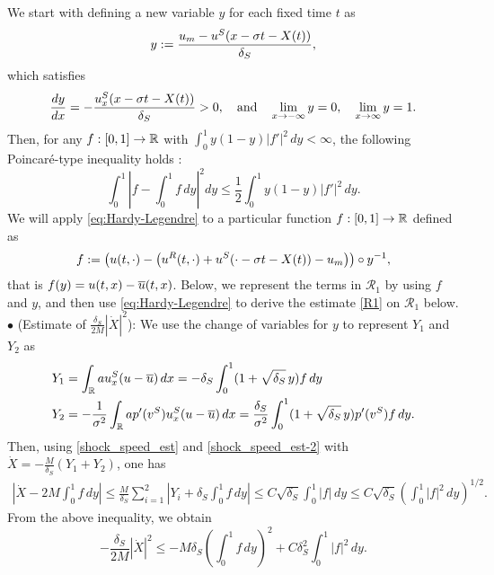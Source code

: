 \documentclass[11pt,reqno]{amsart}
\begin{document}
	We start with defining a new variable $y$ for each fixed time $t$ as
	\begin{equation*} 
	y:=\frac{u_m -u^S(x-\sigma t-X(t))}{\delta_S},
	\end{equation*}
	which satisfies
	\begin{equation*}
	\frac{d y}{d x} = -\frac{u^S_x (x-\sigma t-X(t))}{\delta_S} >0,\quad\mbox{and}\quad\lim_{x\to -\infty} y=0, \quad \lim_{x \to \infty}y=1.
	\end{equation*}
	Then, for any $f:[0,1] \to \mathbb{R}$ with $\int_0^1 y(1-y) |f'|^2 \, dy <\infty$, the following Poincar\'e-type inequality holds \cite[Lemma 2.9]{KV21}:
	\begin{equation}\label{eq:Hardy-Legendre}
		\int_0^1 \left| f-\int_0^1 f \,dy \right|^2 dy \le \frac{1}{2} \int_0^1 y(1-y)|f'|^2 \,dy.
	\end{equation}
	We will apply \eqref{eq:Hardy-Legendre} to a particular function $f:[0,1]\to\mathbb{R}$ defined as
	\begin{equation*} 
	f:=\left(u(t,\cdot)-\left( u^R(t,\cdot)+u^S(\cdot-\sigma t-X(t) )-u_m \right)   \right)\circ y^{-1},
	\end{equation*}
	that is $f(y)=u(t,x)-\overline{u}(t,x)$. Below, we represent the terms in $\mathcal{R}_1$ by using $f$ and $y$, and then use \eqref{eq:Hardy-Legendre} to derive the estimate \eqref{R1} on $\mathcal{R}_1$ below.\\
	
	\noindent $\bullet$  (Estimate of $\frac{\delta_S}{2M}|\dot{X}|^2$): 
	We use the change of variables for $y$ to represent $Y_1$ and $Y_2$ as 
 \begin{align*}
     &Y_1=\int_{\mathbb{R}} a u^S_x (u-\overline{u})\,dx
	=-\delta_S \int_0^1 (1+\sqrt{\delta_S}\, y) f \,dy \\
     &Y_2=-\frac{1}{\sigma^2} \int_{\mathbb{R}} a p'(v^S)u^S_x (u-\overline{u}) \, d x=\frac{\delta_S}{\sigma^2} \int_0^1(1+\sqrt{\delta_S}\, y) p'(v^S) f \, dy.
 \end{align*}
	Then, using \eqref{shock_speed_est} and \eqref{shock_speed_est-2} with $\dot{X}=-\frac{M}{\delta_S}(Y_1+Y_2)$, one has
    \begin{align*}
    \left| \dot{X} - 2 M \int_0^1 f \, dy \right| \le \frac{M}{\delta_S} \sum_{i=1}^2 \left| Y_i +\delta_S \int_0^1 f \, dy \right| \le C \sqrt{\delta_S} \int_0^1 |f| \, dy\le C\sqrt{\delta_S}\left(\int_0^1 |f|^2\,dy\right)^{1/2}.
    \end{align*}
   From the above inequality, we obtain
    \begin{equation}\label{est-dotX}
    -\frac{\delta_S}{2M} |\dot{X}|^2 \le -M \delta_S \left(\int_0^1 f \, dy \right)^2 +C \delta_S^2 \int_0^1 |f|^2 \, dy.
    \end{equation}
	
\end{document}
